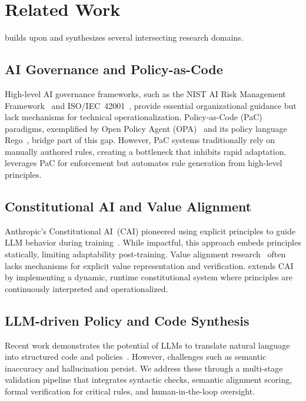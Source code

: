 \section{Related Work}
\label{sec:related_work}
\acgs{} builds upon and synthesizes several intersecting research domains.

\subsection{AI Governance and Policy-as-Code}
High-level AI governance frameworks, such as the NIST AI Risk Management Framework~\cite{nist2023ai} and ISO/IEC~42001~\cite{iso42001}, provide essential organizational guidance but lack mechanisms for technical operationalization. Policy-as-Code (PaC) paradigms, exemplified by Open Policy Agent (OPA)~\cite{opa2023} and its policy language Rego~\cite{rego2019}, bridge part of this gap. However, PaC systems traditionally rely on manually authored rules, creating a bottleneck that inhibits rapid adaptation. \acgs{} leverages PaC for enforcement but automates rule generation from high-level principles.

\subsection{Constitutional AI and Value Alignment}
Anthropic's Constitutional AI~(CAI) pioneered using explicit principles to guide LLM behavior during training~\cite{anthropic2022constitutional}. While impactful, this approach embeds principles statically, limiting adaptability post-training. Value alignment research~\cite{russell2019human} often lacks mechanisms for explicit value representation and verification. \acgs{} extends CAI by implementing a dynamic, runtime constitutional system where principles are continuously interpreted and operationalized.

\subsection{LLM-driven Policy and Code Synthesis}
Recent work demonstrates the potential of LLMs to translate natural language into structured code and policies~\cite{propertygpt2023, veriplan2023}. However, challenges such as semantic inaccuracy and hallucination persist. We address these through a multi-stage validation pipeline that integrates syntactic checks, semantic alignment scoring, formal verification for critical rules, and human-in-the-loop oversight.

